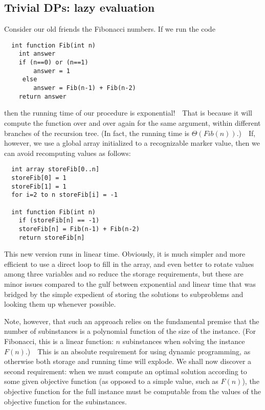 \documentclass[11pt]{article}
\begin{document}
\subsection{Trivial DPs: lazy evaluation}
Consider our old friends the Fibonacci numbers.  If we run the code
\begin{verbatim}
  int function Fib(int n)
    int answer
    if (n==0) or (n==1)
        answer = 1
     else
        answer = Fib(n-1) + Fib(n-2)
    return answer
\end{verbatim}
then the running time of our procedure is exponential!\ \ That is because
it will compute the function over and over again for the same argument,
within different branches of the recursion tree.  (In fact, the running
time is $\Theta(Fib(n))$.)\ \ If, however, we use a global array initialized
to a recognizable marker value, then we can avoid recomputing values as
follows:
\begin{verbatim}
  int array storeFib[0..n]
  storeFib[0] = 1
  storeFib[1] = 1
  for i=2 to n storeFib[i] = -1

  int function Fib(int n)
    if (storeFib[n] == -1)
	storeFib[n] = Fib(n-1) + Fib(n-2)
    return storeFib[n]
\end{verbatim}
This new version runs in linear time.  Obviously, it is much simpler and
more efficient to use a direct loop to fill in the array, and even better
to rotate values among three variables and so reduce the storage requirements,
but these are minor issues compared to the gulf between exponential and linear
time that was bridged by the simple expedient of storing the solutions to
subproblems and looking them up whenever possible.

Note, however, that such an approach relies on the fundamental premise
that the number of subinstances is a polynomial function of the size of
the instance.  (For Fibonacci, this is a linear function: $n$ subinstances
when solving the instance $F(n)$.)\ \ This is an absolute requirement
for using dynamic programming, as otherwise both storage and running time
will explode.  We shall now discover a second requirement: when we must
compute an optimal solution according to some given objective function
(as opposed to a simple value, such as $F(n)$), the objective function
for the full instance must be computable from the values of the objective
function for the subinstances.
\end{document}
